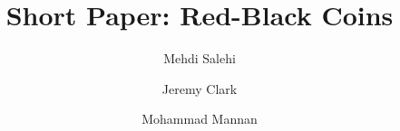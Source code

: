 \documentclass[envcountsect]{llncs}
\begin{document}
\frontmatter
\mainmatter

\title{\Large \bf Short Paper: Red-Black Coins}

\author{
Mehdi Salehi \and
Jeremy Clark \and
Mohammad Mannan
}


\maketitle







%
%






\clearpage
\appendix

\end{document}
